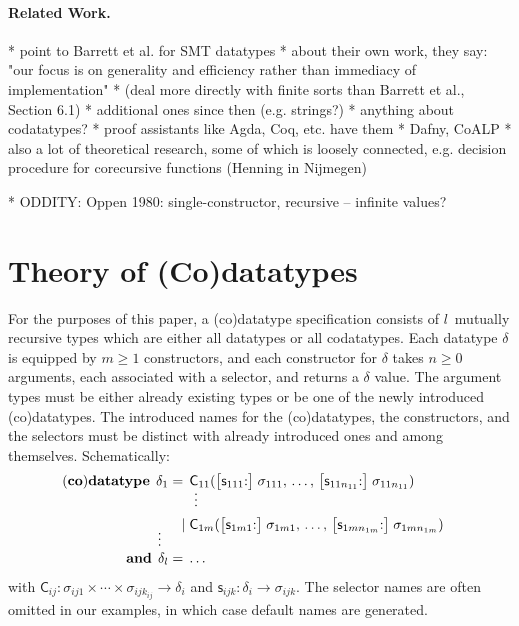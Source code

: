 \documentclass[a4paper,oribibl,envcountsame,draft]{llncs}
\begin{document}
\paragraph{Related Work.}

    * point to Barrett et al. for SMT datatypes
      * about their own work, they say: "our focus is on generality and
        efficiency rather than immediacy of implementation"
      * (deal more directly with finite sorts than Barrett et al., Section 6.1)
    * additional ones since then (e.g. strings?)
    * anything about codatatypes?
      * proof assistants like Agda, Coq, etc. have them
      * Dafny, CoALP
      * also a lot of theoretical research, some of which is loosely connected,
        e.g. decision procedure for corecursive functions (Henning in Nijmegen)

    * ODDITY: Oppen 1980: single-constructor, recursive -- infinite values?

\section{Theory of (Co)datatypes}
\label{sec:theory-of-co-datatypes}

\newcommand\keyw[1]{\textbf{#1}}
\newcommand\const[1]{\textsf{#1}}
\newcommand\ty[1]{\mathit{#1}}

For the purposes of this paper, a (co)datatype specification consists of
$l$~mutually recursive types which are either all datatypes or all codatatypes.
Each datatype $\delta$ is equipped by $m \ge 1$ constructors, and each
constructor for $\delta$ takes $n \ge 0$ arguments, each associated with a
selector, and returns a $\delta$ value. The argument types must be either
already existing types or be one of the newly introduced (co)datatypes. The
introduced names for the (co)datatypes, the constructors, and the selectors must
be distinct with already introduced ones and among themselves. Schematically:
%
\[
\begin{aligned}[t]
(\keyw{co})\keyw{datatype}\;\,
  \delta_1 & {}=\, \const{C}_{11}(\bigl[\const{s}_{111}{:}\bigr]\; \sigma_{111}, \,\ldots,\, \bigl[\const{s}_{11n_{11}}{:}\bigr]\; \sigma_{11n_{11}}) & \\
           & {}\;\phantom{=\,}\;{} \smash{\,\,\vdots} \\ %
           & {}\;\phantom{=\,}\llap{\ensuremath{\mid}}\; \const{C}_{1m}(\bigl[\const{s}_{1m1}{:}\bigr]\; \sigma_{1m1}, \,\ldots,\, \big[\const{s}_{1mn_{1m}}{:}\big]\; \sigma_{1mn_{1m}}) \\[-1\jot]
   \smash{\vdots\,\,\,} \\[-1\jot]
  \keyw{and}\; \,\delta_l & =\, \ldots
\end{aligned}
\]
%
with
$\const{C}_{ij} : \sigma_{ij1}\times\cdots\times\sigma_{ijk_{ij}} \to \delta_i$
and $\const{s}_{ijk} : \delta_i \to \sigma_{ijk}$. The selector names are often
omitted in our examples, in which case default names are generated.
\end{document}
